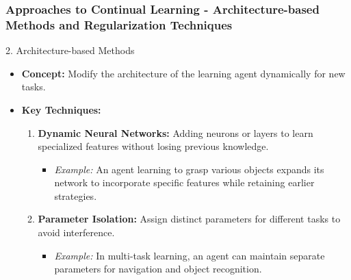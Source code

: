 \documentclass[aspectratio=169]{beamer}
\begin{document}
\begin{frame}[fragile]
    \frametitle{Approaches to Continual Learning - Architecture-based Methods and Regularization Techniques}
    \begin{block}{2. Architecture-based Methods}
        \begin{itemize}
            \item \textbf{Concept:} Modify the architecture of the learning agent dynamically for new tasks.
            \item \textbf{Key Techniques:}
                \begin{enumerate}
                    \item \textbf{Dynamic Neural Networks:} Adding neurons or layers to learn specialized features without losing previous knowledge.
                          \begin{itemize}
                              \item \textit{Example:} An agent learning to grasp various objects expands its network to incorporate specific features while retaining earlier strategies.
                          \end{itemize}
                    \item \textbf{Parameter Isolation:} Assign distinct parameters for different tasks to avoid interference.
                          \begin{itemize}
                              \item \textit{Example:} In multi-task learning, an agent can maintain separate parameters for navigation and object recognition.
                          \end{itemize}
                \end{enumerate}
        \end{itemize}
    \end{block}


\end{frame}
\end{document}
